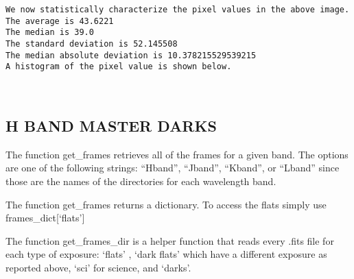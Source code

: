 \documentclass[11pt]{article}
\begin{document}
    \begin{Verbatim}[commandchars=\\\{\}]
We now statistically characterize the pixel values in the above image.
The average is 43.6221
The median is 39.0
The standard deviation is 52.145508
The median absolute deviation is 10.378215529539215
A histogram of the pixel value is shown below.
    \end{Verbatim}

    \begin{center}
    \end{center}
    { \hspace*{\fill} \\}
    
    \hypertarget{h-band-master-darks}{%
\subsection{H BAND MASTER DARKS}\label{h-band-master-darks}}

    The function get\_frames retrieves all of the frames for a given band.
The options are one of the following strings: ``Hband'', ``Jband'',
``Kband'', or ``Lband'' since those are the names of the directories for
each wavelength band.

The function get\_frames returns a dictionary. To access the flats
simply use frames\_dict{[}`flats'{]}

The function get\_frames\_dir is a helper function that reads every
.fits file for each type of exposure: `flats' , `dark flats' which have
a different exposure as reported above, `sci' for science, and `darks'.
\end{document}
